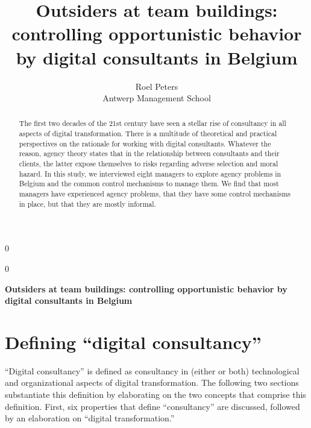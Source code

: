 \documentclass[12pt]{article}
\newcommand{\blind}{0}
\begin{document}
\def\spacingset#1{\renewcommand{\baselinestretch}%
{#1}\small\normalsize} \spacingset{1}



\blind
{
  \title{\bf Outsiders at team buildings: controlling opportunistic
behavior by digital consultants in Belgium}

  \author{
        Roel Peters \\
    Antwerp Management School\\
      }
  \maketitle
} \fi

\blind
{
  \bigskip
  \bigskip
  \bigskip
  \begin{center}
    {\LARGE\bf Outsiders at team buildings: controlling opportunistic
behavior by digital consultants in Belgium}
  \end{center}
  \medskip
} \fi

\bigskip
\begin{abstract}
The first two decades of the 21st century have seen a stellar rise of
consultancy in all aspects of digital transformation. There is a
multitude of theoretical and practical perspectives on the rationale for
working with digital consultants. Whatever the reason, agency theory
states that in the relationship between consultants and their clients,
the latter expose themselves to risks regarding adverse selection and
moral hazard. In this study, we interviewed eight managers to explore
agency problems in Belgium and the common control mechanisms to manage
them. We find that most managers have experienced agency problems, that
they have some control mechanisms in place, but that they are mostly
informal.
\end{abstract}

\noindent%
 

\vfill

\newpage
\spacingset{1.9} %

\section{Defining ``digital
consultancy''}\label{defining-digital-consultancy}

``Digital consultancy'' is defined as consultancy in (either or both)
technological and organizational aspects of digital transformation. The
following two sections substantiate this definition by elaborating on
the two concepts that comprise this definition. First, six properties
that define ``consultancy'' are discussed, followed by an elaboration on
``digital transformation.''
\end{document}
